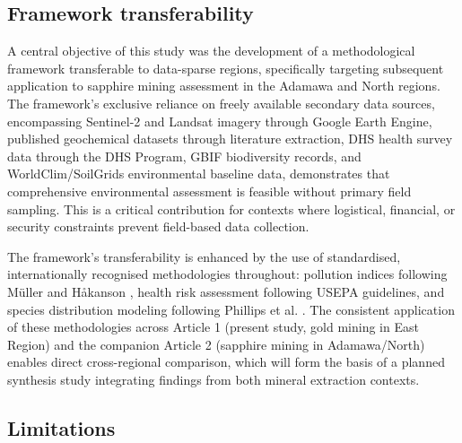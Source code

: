 \documentclass[preprint,12pt,authoryear]{elsarticle}
\begin{document}
\subsection{Framework transferability}

A central objective of this study was the development of a methodological framework transferable to data-sparse regions, specifically targeting subsequent application to sapphire mining assessment in the Adamawa and North regions. The framework's exclusive reliance on freely available secondary data sources, encompassing Sentinel-2 and Landsat imagery through Google Earth Engine, published geochemical datasets through literature extraction, DHS health survey data through the DHS Program, GBIF biodiversity records, and WorldClim/SoilGrids environmental baseline data, demonstrates that comprehensive environmental assessment is feasible without primary field sampling. This is a critical contribution for contexts where logistical, financial, or security constraints prevent field-based data collection.

The framework's transferability is enhanced by the use of standardised, internationally recognised methodologies throughout: pollution indices following M\"{u}ller \citep{Muller1969} and H\r{a}kanson \citep{Hakanson1980}, health risk assessment following USEPA \citep{USEPA2011} guidelines, and species distribution modeling following Phillips et al. \citep{Phillips2006}. The consistent application of these methodologies across Article 1 (present study, gold mining in East Region) and the companion Article 2 (sapphire mining in Adamawa/North) enables direct cross-regional comparison, which will form the basis of a planned synthesis study integrating findings from both mineral extraction contexts.

\subsection{Limitations}
\end{document}
